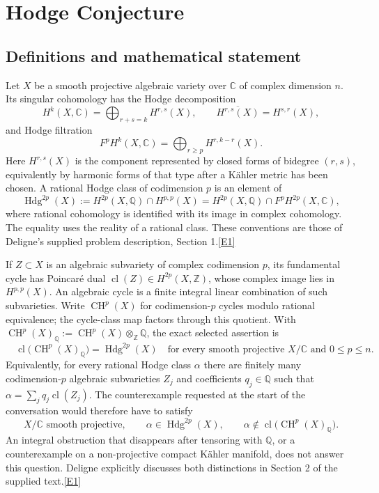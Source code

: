 \documentclass[11pt]{article}
\newcommand{\Q}{\mathbb Q}
\newcommand{\Z}{\mathbb Z}
\newcommand{\C}{\mathbb C}
\newcommand{\cl}{\operatorname{cl}}
\newcommand{\CH}{\operatorname{CH}}
\newcommand{\src}[1]{\hyperlink{src:#1}{[#1]}}
\begin{document}
\section*{\texorpdfstring{Hodge Conjecture}{Hodge Conjecture}}\label{hodge}
\subsection{Definitions and mathematical statement}
Let $X$ be a smooth projective algebraic variety over $\C$ of complex dimension
$n$. Its singular cohomology has the Hodge decomposition
\[
 H^k(X,\C)=\bigoplus_{r+s=k}H^{r,s}(X),\qquad
 \overline{H^{r,s}(X)}=H^{s,r}(X),
\]
and Hodge filtration
\[
 F^pH^k(X,\C)=\bigoplus_{r\ge p}H^{r,k-r}(X).
\]
Here $H^{r,s}(X)$ is the component represented by closed forms of bidegree
$(r,s)$, equivalently by harmonic forms of that type after a K\"ahler metric
has been chosen. A rational Hodge class of codimension $p$ is an element of
\[
 \operatorname{Hdg}^{2p}(X)
 :=H^{2p}(X,\Q)\cap H^{p,p}(X)
 =H^{2p}(X,\Q)\cap F^pH^{2p}(X,\C),
\]
where rational cohomology is identified with its image in complex cohomology.
The equality uses the reality of a rational class. These conventions are those
of Deligne's supplied problem description, Section 1.\src{E1}

If $Z\subset X$ is an algebraic subvariety of complex codimension $p$, its
fundamental cycle has Poincar\'e dual
$\cl(Z)\in H^{2p}(X,\Z)$, whose complex image lies in $H^{p,p}(X)$.
An algebraic cycle is a finite integral linear combination of such
subvarieties. Write $\CH^p(X)$ for codimension-$p$ cycles modulo rational
equivalence; the cycle-class map factors through this quotient. With
$\CH^p(X)_{\Q}:=\CH^p(X)\otimes_{\Z}\Q$, the exact selected assertion is
\begin{equation}\label{hodge:statement}
 \boxed{\quad
 \cl\bigl(\CH^p(X)_{\Q}\bigr)=\operatorname{Hdg}^{2p}(X)
 \quad\text{for every smooth projective }X/\C\text{ and }0\le p\le n.
 \quad}
\end{equation}
Equivalently, for every rational Hodge class $\alpha$ there are finitely many
codimension-$p$ algebraic subvarieties $Z_j$ and coefficients $q_j\in\Q$ such
that $\alpha=\sum_jq_j\cl(Z_j)$. The counterexample requested at the start of
the conversation would therefore have to satisfy
\begin{equation}\label{hodge:counterexample}
 X/\C\text{ smooth projective},\qquad
 \alpha\in\operatorname{Hdg}^{2p}(X),\qquad
 \alpha\notin\cl\bigl(\CH^p(X)_{\Q}\bigr).
\end{equation}
An integral obstruction that disappears after tensoring with $\Q$, or a
counterexample on a non-projective compact K\"ahler manifold, does not answer
this question. Deligne explicitly discusses both distinctions in Section 2
of the supplied text.\src{E1}
\end{document}
